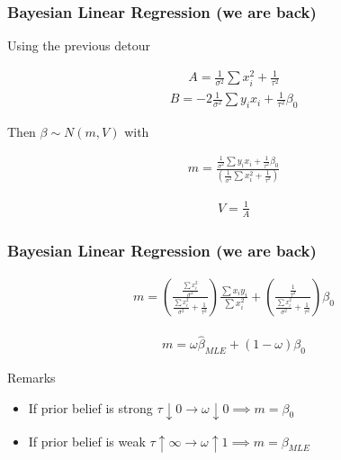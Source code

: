 \documentclass[
  shownotes,
  xcolor={svgnames},
  hyperref={colorlinks,citecolor=DarkBlue,linkcolor=DarkRed,urlcolor=DarkBlue}
  ]{beamer}
\begin{document}
\begin{frame}[fragile]
\frametitle{Bayesian Linear Regression (we are back)}

Using the previous detour

\begin{align}
A= \frac{1}{\sigma^2}\sum x_i^2 +\frac{1}{\tau^2}
\end{align}
\medskip
\begin{align}
B= -2 \frac{1}{\sigma^2}\sum y_i x_i +\frac{1}{\tau^2} \beta_0
\end{align}

Then $\beta\sim N(m,V)$ with

\begin{align}
m=\frac{\frac{1}{\sigma^2}\sum y_i x_i +\frac{1}{\tau^2} \beta_0}{(\frac{1}{\sigma^2}\sum x_i^2 +\frac{1}{\tau^2})}
\end{align}

\begin{align}
 V=\frac{1}{A}
\end{align}


\end{frame}

\begin{frame}[fragile]
\frametitle{Bayesian Linear Regression (we are back)}

\begin{align}
m=\left(\frac{\frac{\sum x_i^2}{\sigma^2}}{\frac{\sum x_i^2}{\sigma^2}+\frac{1}{\tau^2}}\right)\frac{\sum x_iy_i}{\sum x_i^2} + \left(\frac{\frac{1}{\tau^2}}{\frac{\sum x_i^2}{\sigma^2}+\frac{1}{\tau^2}}\right)\beta_0
\end{align}

\medskip

\begin{align}
m = \omega \hat \beta_{MLE} + (1-\omega) \beta_0
\end{align}

Remarks 

\begin{itemize}
  \item If prior belief is strong $\tau \downarrow 0 \rightarrow \omega \downarrow 0 \implies m=\beta_0$ 
  \item If prior belief is weak $\tau \uparrow \infty \rightarrow \omega \uparrow 1 \implies m=\beta_{MLE}$ 

\end{itemize}

\end{frame}
\end{document}
